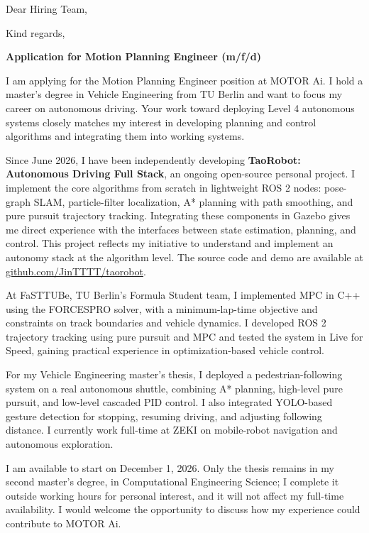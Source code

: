 \documentclass[11pt,a4paper,sans]{moderncv}
\begin{document}
\date{\today}
\opening{Dear Hiring Team,}
\closing{Kind regards,}
\makelettertitle

\textbf{Application for Motion Planning Engineer (m/f/d)}

\justifying
\setlength{\parindent}{0pt}

I am applying for the Motion Planning Engineer position at MOTOR Ai. I hold a master's degree in Vehicle Engineering from TU Berlin and want to focus my career on autonomous driving. Your work toward deploying Level 4 autonomous systems closely matches my interest in developing planning and control algorithms and integrating them into working systems.

Since June 2026, I have been independently developing \textbf{TaoRobot: Autonomous Driving Full Stack}, an ongoing open-source personal project. I implement the core algorithms from scratch in lightweight ROS 2 nodes: pose-graph SLAM, particle-filter localization, A* planning with path smoothing, and pure pursuit trajectory tracking. Integrating these components in Gazebo gives me direct experience with the interfaces between state estimation, planning, and control. This project reflects my initiative to understand and implement an autonomy stack at the algorithm level. The source code and demo are available at \href{https://github.com/JinTTTT/taorobot}{github.com/JinTTTT/taorobot}.

At FaSTTUBe, TU Berlin's Formula Student team, I implemented MPC in C++ using the FORCESPRO solver, with a minimum-lap-time objective and constraints on track boundaries and vehicle dynamics. I developed ROS 2 trajectory tracking using pure pursuit and MPC and tested the system in Live for Speed, gaining practical experience in optimization-based vehicle control.

For my Vehicle Engineering master's thesis, I deployed a pedestrian-following system on a real autonomous shuttle, combining A* planning, high-level pure pursuit, and low-level cascaded PID control. I also integrated YOLO-based gesture detection for stopping, resuming driving, and adjusting following distance. I currently work full-time at ZEKI on mobile-robot navigation and autonomous exploration.

I am available to start on December 1, 2026. Only the thesis remains in my second master's degree, in Computational Engineering Science; I complete it outside working hours for personal interest, and it will not affect my full-time availability. I would welcome the opportunity to discuss how my experience could contribute to MOTOR Ai.

\makeletterclosing
\end{document}
